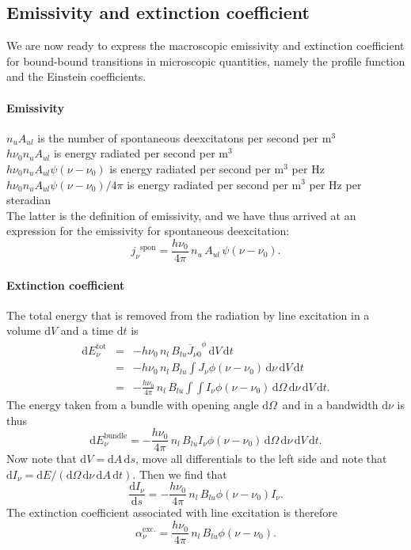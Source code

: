 \documentclass[12pt]{article}
\numberwithin{equation}{section}
\def\dd{\mathrm{d}}
\def\Inu{\ensuremath{I_{\nu}}}
\def\jnu{\ensuremath{j_{\nu}}}
\def\Jnu{\ensuremath{J_{\nu}}}
\def\Jbar{\ensuremath{\overline{J}_{\nu0}}}
\def\dO{\ensuremath{\dd \Omega}}
\newcommand{\be}{\begin{equation}}
\newcommand{\ee}{\end{equation}}
\newcommand{\bea}{\begin{eqnarray}}
\newcommand{\eea}{\end{eqnarray}}
\begin{document}
\subsection{Emissivity and extinction coefficient}

We are now ready to express the macroscopic emissivity and extinction coefficient for bound-bound transitions in microscopic quantities, namely the profile function and the Einstein coefficients.

\paragraph{Emissivity}
$n_u A_{ul}$ is the number of spontaneous deexcitatons per second per m$^{3}$ \\
$h \nu_0 n_u A_{ul}$ is energy radiated per second per m$^{3}$  \\
$h \nu_0 n_u A_{ul} \psi(\nu-\nu_0)$ is energy radiated per second per m$^{3}$  per Hz \\
$h \nu_0 n_u A_{ul} \psi(\nu-\nu_0) /4\pi$ is energy radiated per second per m$^{3}$  per Hz per steradian \\

The latter is the definition of emissivity, and we have thus arrived at an expression for the emissivity for spontaneous deexcitation:
\be
\jnu^\mathrm{spon} = \frac{h \nu_0}{4\pi} \, n_u  \,A_{ul}  \, \psi(\nu-\nu_0).
\ee

\paragraph{Extinction coefficient}
The total energy that is removed from the radiation by line excitation in a volume $\dd V$ and a time $\dd t$ is
\bea
\dd E_\nu^\mathrm{tot} &=&  -h \nu_0 \, n_l \, B_{lu}  \Jbar^\phi \, \dd V  \, \dd t    \nonumber \\
 & =&  -h \nu_0 \, n_l \, B_{lu}  \int \Jnu \phi(\nu-\nu_0) \, \dd \nu  \, \dd V  \, \dd t    \nonumber \\
 & =&  -\frac{h \nu_0}{4 \pi} \, n_l \, B_{lu}  \int \int \Inu \phi(\nu-\nu_0) \, \dO \, \dd \nu  \, \dd V  \, \dd t.  
\eea
The energy taken from a bundle with opening angle \dO\ and in a bandwidth $\dd \nu$ is thus
\be
\dd E_\nu^\mathrm{bundle} = - \frac{h \nu_0}{4 \pi} \, n_l \, B_{lu}  \Inu \phi(\nu-\nu_0) \, \dO \, \dd \nu  \, \dd V  \, \dd t.
\ee
Now note that $\dd V = \dd A \, \dd s$, move all differentials to the left side and note that $\dd \Inu = \dd E / ( \dO \, \dd \nu  \, \dd A  \, \dd t)$. Then we find that
\be
\frac{\dd \Inu}{\dd s} = - \frac{h \nu_0}{4 \pi} \, n_l \, B_{lu}  \phi(\nu-\nu_0) \Inu.
\ee
The extinction coefficient associated with line excitation is therefore
\be
\alpha_\nu^\mathrm{exc.} = \frac{h \nu_0}{4 \pi}  \, n_l \, B_{lu} \phi(\nu-\nu_0).
\ee
\end{document}
